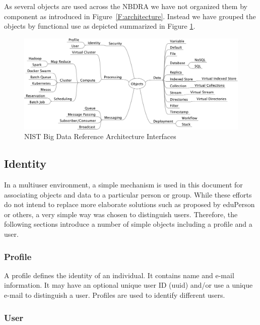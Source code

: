 \documentclass[10pt]{article}
\begin{document}
As several objects are used across the NBDRA we have not organized
them by component as introduced in
Figure~\ref{F:architecture}. Instead we have grouped the objects by
functional use as depicted summarized in Figure \ref{F:interfaces}.

\begin{figure}[h]\centering
\includegraphics[width=1.1\textwidth]{images/interfaces}
\caption{NIST Big Data Reference Architecture Interfaces}
\label{F:interfaces}
\end{figure}


\subsection{Identity}

In a multiuser environment, a simple mechanism is used in this document for
associating objects and data to a particular person or group. While 
these efforts do not intend to replace more elaborate solutions such as proposed
by eduPerson \cite{www-eduperson} or others, a very simple way
was chosen to distinguish users. Therefore, the following sections introduce a number of
simple objects including a profile and a user.

\subsubsection{Profile}

A profile defines the identity of an individual. It contains name and
e-mail information. It may have an optional unique user ID (uuid) and/or use a unique
e-mail to distinguish a user. Profiles are used to identify different
users.


\subsubsection{User}
\end{document}
